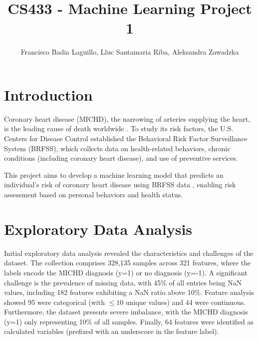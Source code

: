 \documentclass[10pt,conference,compsocconf]{IEEEtran}
\begin{document}
\title{CS433 - Machine Learning Project 1}

\author{
  Francisco Badia Laguillo, Lluc Santamaria Riba, Aleksandra Zawadzka\\
}

\maketitle

\section{Introduction}
Coronary heart disease (MICHD), the narrowing of arteries supplying the heart, is the leading cause of death worldwide \cite{bhf2025}. To study its risk factors, the U.S. Centers for Disease Control established the Behavioral Risk Factor Surveillance System (BRFSS), which collects data on health-related behaviors, chronic conditions (including coronary heart disease), and use of preventive services.

This project aims to develop a machine learning model that predicts an individual’s risk of coronary heart disease using BRFSS data \cite{cdc_brfss2024}, enabling risk assessment based on personal behaviors and health status.

\section{Exploratory Data Analysis}
Initial exploratory data analysis revealed the characteristics and challenges of the dataset. The collection comprises 328,135 samples across 321 features, where the labels encode the MICHD diagnosis (y=1) or no diagnosis (y=-1). A significant challenge is the prevalence of missing data, with 45\% of all entries being NaN values, including 182 features exhibiting a NaN ratio above 10\%. Feature analysis showed 95 were categorical (with $\leq10$ unique values) and 44 were continuous. Furthermore, the dataset presents severe imbalance, with the MICHD diagnosis (y=1) only representing 10\% of all samples. Finally, 64 features were identified as calculated variables (prefixed with an underscore in the feature label).
\end{document}
